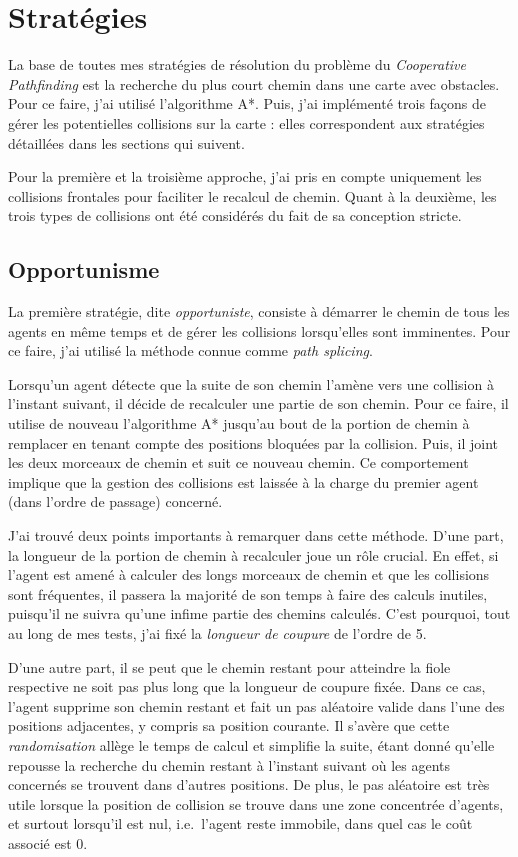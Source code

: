 \documentclass[letterpaper]{article}
\begin{document}
\section{Strat\'egies}
La base de toutes mes strat\'egies de r\'esolution du probl\`eme du \textit{Cooperative Pathfinding} est la recherche du plus court chemin dans une carte avec obstacles. 
Pour ce faire, j'ai utilis\'e l'algorithme A*.
Puis, j'ai impl\'ement\'e trois fa\c{c}ons de g\'erer les potentielles collisions sur la carte : elles correspondent aux strat\'egies d\'etaill\'ees dans les sections qui suivent.

Pour la premi\`ere et la troisi\`eme approche, j'ai pris en compte uniquement les collisions frontales pour faciliter le recalcul de chemin. 
Quant \`a la deuxi\`eme, les trois types de collisions ont \'et\'e consid\'er\'es du fait de sa conception stricte.

\subsection{Opportunisme}
La premi\`ere strat\'egie, dite \textit{opportuniste}, consiste \`a d\'emarrer le chemin de tous les agents en m\^eme temps et de g\'erer les collisions lorsqu'elles sont imminentes.
Pour ce faire, j'ai utilis\'e la m\'ethode connue comme \textit{path splicing}.

Lorsqu'un agent d\'etecte que la suite de son chemin l'am\`ene vers une collision \`a l'instant suivant, il d\'ecide de recalculer une partie de son chemin.
Pour ce faire, il utilise de nouveau l'algorithme A* jusqu'au bout de la portion de chemin \`a remplacer en tenant compte des positions bloqu\'ees par la collision.
Puis, il joint les deux morceaux de chemin et suit ce nouveau chemin. Ce comportement implique que la gestion des collisions est laiss\'ee \`a la charge du premier agent (dans l'ordre de passage) concern\'e.

J'ai trouv\'e deux points importants \`a remarquer dans cette m\'ethode.
D'une part, la longueur de la portion de chemin \`a recalculer joue un r\^ole crucial.
En effet, si l'agent est amen\'e \`a calculer des longs morceaux de chemin et que les collisions sont fr\'equentes, il passera la majorit\'e de son temps \`a faire des calculs inutiles, puisqu'il ne suivra qu'une infime partie des chemins calcul\'es.
C'est pourquoi, tout au long de mes tests, j'ai fix\'e la \textit{longueur de coupure} de l'ordre de 5.

D'une autre part, il se peut que le chemin restant pour atteindre la fiole respective ne soit pas plus long que la longueur de coupure fix\'ee.
Dans ce cas, l'agent supprime son chemin restant et fait un pas al\'eatoire valide dans l'une des positions adjacentes, y compris sa position courante.
Il s'av\`ere que cette \textit{randomisation} all\`ege le temps de calcul et simplifie la suite, \'etant donn\'e qu'elle repousse la recherche du chemin restant \`a l'instant suivant o\`u les agents concern\'es se trouvent dans d'autres positions.
De plus, le pas al\'eatoire est tr\`es utile lorsque la position de collision se trouve dans une zone concentr\'ee d'agents, et surtout lorsqu'il est nul, i.e.\ l'agent reste immobile, dans quel cas le co\^ut associ\'e est 0.
\end{document}

